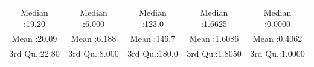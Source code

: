 \documentclass[]{article}
\begin{document}
\begin{longtable}[c]{@{}ccccc@{}}
\begin{minipage}[t]{0.17\columnwidth}\centering\strut
Median :19.20
\strut\end{minipage} &
\begin{minipage}[t]{0.17\columnwidth}\centering\strut
Median :6.000
\strut\end{minipage} &
\begin{minipage}[t]{0.17\columnwidth}\centering\strut
Median :123.0
\strut\end{minipage} &
\begin{minipage}[t]{0.18\columnwidth}\centering\strut
Median :1.6625
\strut\end{minipage} &
\begin{minipage}[t]{0.18\columnwidth}\centering\strut
Median :0.0000
\strut\end{minipage}\tabularnewline
\begin{minipage}[t]{0.17\columnwidth}\centering\strut
Mean :20.09
\strut\end{minipage} &
\begin{minipage}[t]{0.17\columnwidth}\centering\strut
Mean :6.188
\strut\end{minipage} &
\begin{minipage}[t]{0.17\columnwidth}\centering\strut
Mean :146.7
\strut\end{minipage} &
\begin{minipage}[t]{0.18\columnwidth}\centering\strut
Mean :1.6086
\strut\end{minipage} &
\begin{minipage}[t]{0.18\columnwidth}\centering\strut
Mean :0.4062
\strut\end{minipage}\tabularnewline
\begin{minipage}[t]{0.17\columnwidth}\centering\strut
3rd Qu.:22.80
\strut\end{minipage} &
\begin{minipage}[t]{0.17\columnwidth}\centering\strut
3rd Qu.:8.000
\strut\end{minipage} &
\begin{minipage}[t]{0.17\columnwidth}\centering\strut
3rd Qu.:180.0
\strut\end{minipage} &
\begin{minipage}[t]{0.18\columnwidth}\centering\strut
3rd Qu.:1.8050
\strut\end{minipage} &
\begin{minipage}[t]{0.18\columnwidth}\centering\strut
3rd Qu.:1.0000
\strut\end{minipage}\tabularnewline

\end{longtable}
\end{document}
